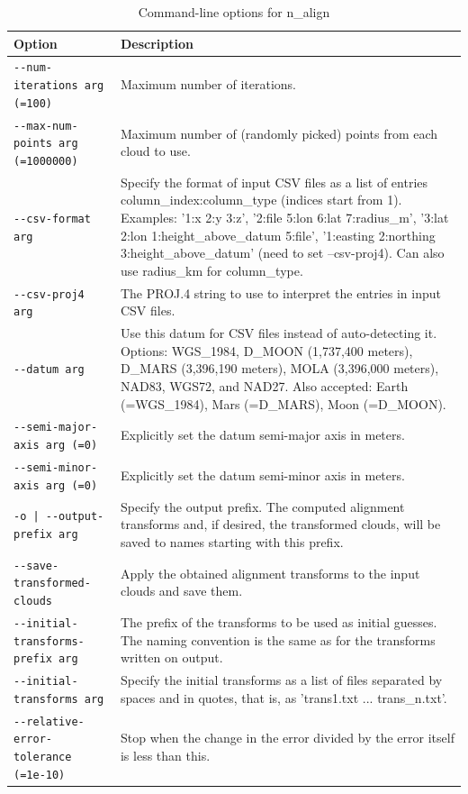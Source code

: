 \begin{longtable}{|l|p{7.5cm}|}
\caption{Command-line options for n\_align}
\label{tbl:nalign}
\endfirsthead
\endhead
\endfoot
\endlastfoot
\hline
Option & Description \\ \hline \hline
\texttt{-\/-num-iterations arg (=100) } & Maximum number of iterations.\\ \hline
\texttt{-\/-max-num-points arg (=1000000) } & Maximum number of (randomly picked) points from each cloud to use.\\ \hline
\texttt{-\/-csv-format arg  } & Specify the format of input CSV files as a list of entries column\_index:column\_type (indices start from 1). Examples: '1:x 2:y 3:z', '2:file 5:lon 6:lat 7:radius\_m', '3:lat 2:lon 1:height\_above\_datum 5:file', '1:easting 2:northing 3:height\_above\_datum' (need to set --csv-proj4). Can also use radius\_km for column\_type.\\ \hline
\texttt{-\/-csv-proj4 arg  } & The PROJ.4 string to use to interpret the entries in input CSV files.\\ \hline
\texttt{-\/-datum arg  } & Use this datum for CSV files instead of auto-detecting it. Options: WGS\_1984, D\_MOON (1,737,400 meters), D\_MARS (3,396,190 meters), MOLA (3,396,000 meters), NAD83, WGS72, and NAD27. Also accepted: Earth (=WGS\_1984), Mars (=D\_MARS), Moon (=D\_MOON).\\ \hline
\texttt{-\/-semi-major-axis arg (=0) } & Explicitly set the datum semi-major axis in meters.\\ \hline
\texttt{-\/-semi-minor-axis arg (=0) } & Explicitly set the datum semi-minor axis in meters.\\ \hline
\texttt{-o | -\/-output-prefix  arg  } & Specify the output prefix. The computed alignment transforms and, if desired, the transformed clouds, will be saved to names starting with this prefix.\\ \hline
\texttt{-\/-save-transformed-clouds  } & Apply the obtained alignment transforms to the input clouds and save them.\\ \hline
\texttt{-\/-initial-transforms-prefix arg  } & The prefix of the transforms to be used as initial guesses. The naming convention is the same as for the transforms written on output.\\ \hline
\texttt{-\/-initial-transforms arg  } & Specify the initial transforms as a list of files separated by spaces and in quotes, that is, as 'trans1.txt ... trans\_n.txt'.\\ \hline
\texttt{-\/-relative-error-tolerance (=1e-10) } & Stop when the change in the error divided by the error itself is less than this.\\ \hline

\end{longtable}
